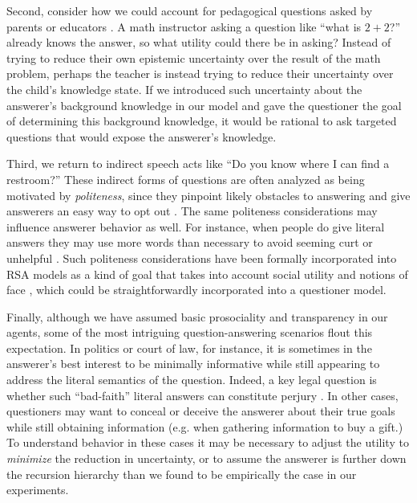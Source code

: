 \documentclass[11pt, floatsintext]{apa6}
\begin{document}
Second, consider how we could account for pedagogical questions asked by parents or educators \cite{MaradlouGinzburg14_SemDial, Gall70_QuestionsInTeaching}. 
A math instructor asking a question like ``what is $2+2$?'' already knows the answer, so what utility could there be in asking? 
Instead of trying to reduce their own epistemic uncertainty over the result of the math problem, perhaps the teacher is instead trying to reduce their uncertainty over the child's knowledge state. 
If we introduced such uncertainty about the answerer's background knowledge in our model and gave the questioner the goal of determining this background knowledge, it would be rational to ask targeted questions that would expose the answerer's knowledge. 

Third, we return to indirect speech acts like ``Do you know where I can find a restroom?'' 
These indirect forms of questions are often analyzed as being motivated by \emph{politeness}, since they pinpoint likely obstacles to answering \cite{FrancikClark85_RequestsOvercomeObstacles} and give answerers an easy way to opt out \cite{brown1987politeness}.
The same politeness considerations may influence answerer behavior as well. 
For instance, when people do give literal answers they may use more words than necessary to avoid seeming curt or unhelpful \cite<see also>{chaudhry2019thanking}. 
Such politeness considerations have been formally incorporated into RSA models as a kind of goal that takes into account social utility and notions of face \cite{yoon2016talking}, which could be straightforwardly incorporated into a questioner model.

Finally, although we have assumed basic prosociality and transparency in our agents, some of the most intriguing question-answering scenarios flout this expectation. 
In politics or court of law, for instance, it is sometimes in the answerer's best interest to be minimally informative while still appearing to address the literal semantics of the question.
Indeed, a key legal question is whether such ``bad-faith'' literal answers can constitute perjury \cite{SolanTiersma05_SpeakingOfCrime}. 
In other cases, questioners may want to conceal or deceive the answerer about their true goals while still obtaining information (e.g. when gathering information to buy a gift.)
To understand behavior in these cases it may be necessary to adjust the utility to \emph{minimize} the reduction in uncertainty, or to assume the answerer is further down the recursion hierarchy than we found to be empirically the case in our experiments.
\end{document}
